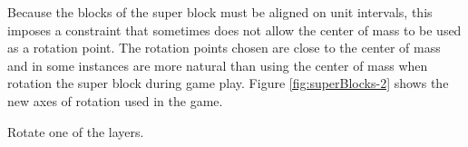 

Because the blocks of the super block must be aligned on unit intervals, this
imposes a constraint that sometimes does not allow the center of mass to be
used as a rotation point.  The rotation points chosen are close to the center
of mass and in some instances are more natural than using the center of mass
when rotation the super block during game play. Figure \ref{fig:superBlocks-2}
shows the new axes of rotation used in the game.



Rotate one of the layers.
